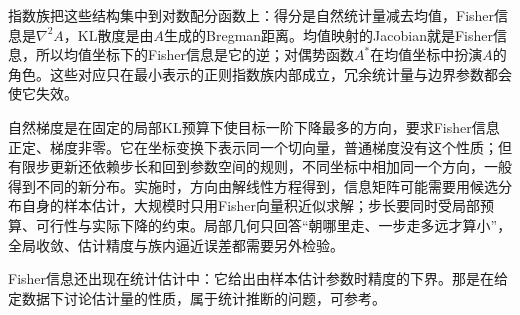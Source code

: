 指数族把这些结构集中到对数配分函数上：得分是自然统计量减去均值，Fisher信息是$\nabla^{2}A$，KL散度是由$A$生成的Bregman距离。均值映射的Jacobian就是Fisher信息，所以均值坐标下的Fisher信息是它的逆；对偶势函数$A^{*}$在均值坐标中扮演$A$的角色。这些对应只在最小表示的正则指数族内部成立，冗余统计量与边界参数都会使它失效。

自然梯度是在固定的局部KL预算下使目标一阶下降最多的方向，要求Fisher信息正定、梯度非零。它在坐标变换下表示同一个切向量，普通梯度没有这个性质；但有限步更新还依赖步长和回到参数空间的规则，不同坐标中相加同一个方向，一般得到不同的新分布。实施时，方向由解线性方程得到，信息矩阵可能需要用候选分布自身的样本估计，大规模时只用Fisher向量积近似求解；步长要同时受局部预算、可行性与实际下降的约束。局部几何只回答“朝哪里走、一步走多远才算小”，全局收敛、估计精度与族内逼近误差都需要另外检验。

Fisher信息还出现在统计估计中：它给出由样本估计参数时精度的下界。那是在给定数据下讨论估计量的性质，属于统计推断的问题，可参考。
